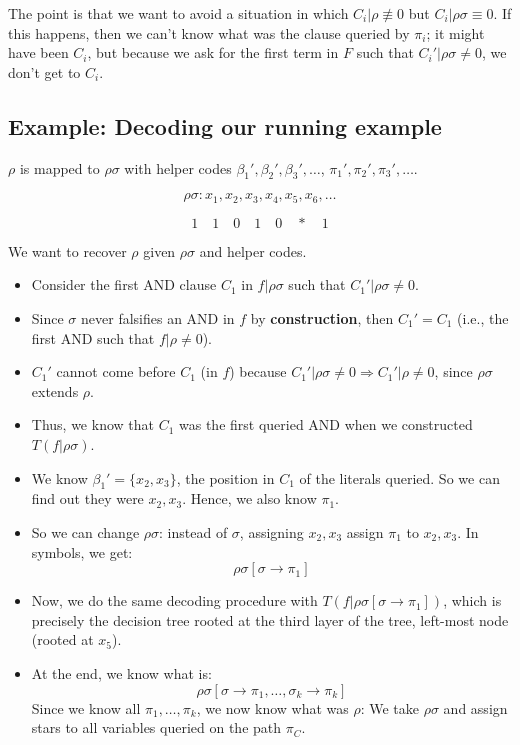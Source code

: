 \begin{note}
\noindent
The point is that we want to avoid a situation in which \( C_i | \rho \not\equiv 0 \) but \( C_i | \rho\sigma \equiv 0 \). If this happens, then we can't know what was the clause queried by \( \pi_i \); it might have been \( C_i \), but because we ask for the first term in \( F \) such that \( C_i' | \rho\sigma \neq 0 \), we don't get to \( C_i \).


\subsection*{Example: Decoding our running example}
\noindent
\( \rho \) is mapped to \( \rho{\sigma} \) with helper codes \( \beta_1', \beta_2', \beta_3', \dots \), \( \pi_1', \pi_2', \pi_3', \dots \).

\[
\rho{\sigma} : x_1, x_2, x_3, x_4, x_5, x_6, \dots
\]

\[
1 \quad 1 \quad 0 \quad 1 \quad 0 \quad * \quad 1
\]

\noindent
We want to recover \( \rho \) given \( \rho{\sigma} \) and helper codes.

\begin{itemize}
    \item Consider the first AND clause \( C_1 \) in \( f | \rho{\sigma} \) such that \( C_1' | \rho{\sigma} \neq 0 \).
    \item Since \( \sigma \) never falsifies an AND in \( f \) by \textbf{construction}, then \( C_1' = C_1 \) (i.e., the first AND such that \( f | \rho \neq 0 \)).
    \item \( C_1' \) cannot come before \( C_1 \) (in \( f \)) because \( C_1' | \rho{\sigma} \neq 0 \Rightarrow C_1' | \rho \neq 0 \), since \( \rho{\sigma} \) extends \( \rho \).
    \item Thus, we know that \( C_1 \) was the first queried AND when we constructed \( T(f | \rho{\sigma}) \).
    \item We know \( \beta_1' = \{ x_2, x_3 \} \), the position in \( C_1 \) of the literals queried. So we can find out they were \( x_2, x_3 \). Hence, we also know \( \pi_1 \).
    \item So we can change \( \rho{\sigma} \): instead of \( \sigma \), assigning \( x_2, x_3 \) assign \( \pi_1 \) to \( x_2, x_3 \). In symbols, we get:
    \[
    \rho{\sigma} [\sigma \to \pi_1]
    \]
    \item Now, we do the same decoding procedure with \( T(f | \rho{\sigma} [\sigma \to \pi_1]) \), which is precisely the decision tree rooted at the third layer of the tree, left-most node (rooted at $x_5$).
    \item At the end, we know what is:
    \[
    \rho{\sigma} [\sigma \to \pi_1, \dots, \sigma_k \to \pi_k]
    \]
    Since we know all \( \pi_1, \dots, \pi_k \), we now know what was \( \rho \): We take \( \rho{\sigma} \) and assign stars to all variables queried on the path \( \pi_C \).
\end{itemize}


\end{note}
